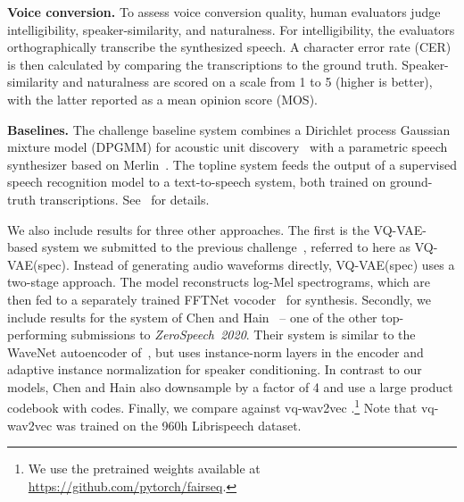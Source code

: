 \documentclass[a4paper]{article}
\begin{document}
\textbf{Voice conversion.}
To assess voice conversion quality, human evaluators judge intelligibility, speaker-similarity, and naturalness.
For intelligibility, the evaluators orthographically transcribe the synthesized speech. 
A character error rate (CER) is then calculated by comparing the transcriptions to the ground truth.
Speaker-similarity and naturalness are scored on a scale from 1 to 5 (higher is better), with the latter reported as a mean opinion score (MOS).



\textbf{Baselines.}
The challenge baseline system combines a Dirichlet process Gaussian mixture model (DPGMM) for acoustic unit discovery~\cite{ondel+etal_pcs16} with a
parametric speech synthesizer based on Merlin~\cite{wu+etal_ssw16}.
The topline system feeds the output of a supervised speech recognition model to a text-to-speech system, both trained on ground-truth transcriptions.
See~\cite{dunbar+etal_interspeech19} for details.


We also include results for three other approaches. 
The first is the VQ-VAE-based system we submitted to the previous challenge~\cite{eloff+etal_interspeech19}, referred to here as VQ-VAE(spec).
Instead of generating audio waveforms directly, VQ-VAE(spec) uses a two-stage approach.
The model reconstructs log-Mel spectrograms, which are then fed to a separately trained FFTNet vocoder~\cite{jin+etal_icassp18} for synthesis.
Secondly, we include results for the system of Chen and Hain~\cite{chen+hain_interspeech20} -- one of the other top-performing submissions to \textit{ZeroSpeech~2020}.
Their system is similar to the WaveNet autoencoder of~\cite{chorowski+etal_taslp19}, but uses instance-norm layers in the encoder and adaptive instance normalization for speaker conditioning. 
In contrast to our models, Chen and Hain also downsample by a factor of 4 and use a large product codebook with  codes.
Finally, we compare against vq-wav2vec \cite{baevski+etal_iclr20}.\footnote{We use the pretrained weights available at \scriptsize{ \url{https://github.com/pytorch/fairseq}}.} Note that vq-wav2vec was trained on the 960h Librispeech dataset.
\end{document}
